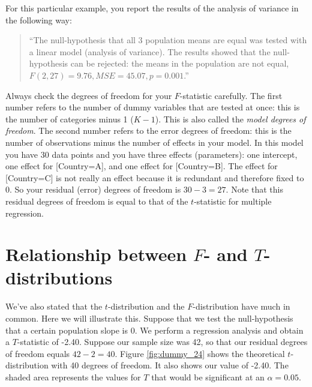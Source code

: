 \documentclass[]{book}\usepackage[]{graphicx}\usepackage[]{color}
\begin{document}
For this particular example, you report the results of the analysis of variance in the following way:

\begin{quote}
``The null-hypothesis that all 3 population means are equal was tested with a linear model (analysis of variance). The results showed that the null-hypothesis can be rejected: the means in the population are not equal, $F(2, 27) = 9.76, MSE = 45.07 , p = 0.001$.''
\end{quote}

Always check the degrees of freedom for your $F$-statistic carefully. The first number refers to the number of dummy variables that are tested at once: this is the number of categories minus 1 ($K-1$). This is also called the \textit{model degrees of freedom}. The second number refers to the error degrees of freedom: this is the number of observations minus the number of effects in your model. In this model you have 30 data points and you have three effects (parameters): one intercept, one effect for [Country=A], and one effect for [Country=B]. The effect for [Country=C] is not really an effect because it is redundant and therefore fixed to 0. So your residual (error) degrees of freedom is $30-3=27$. Note that this residual degrees of freedom is equal to that of the $t$-statistic for multiple regression.





\section{Relationship between $F$- and $T$-distributions}

We've also stated that the $t$-distribution and the $F$-distribution have much in common. Here we will illustrate this. Suppose that we test the null-hypothesis that a certain population slope is 0. We perform a regression analysis and obtain a $T$-statistic of -2.40. Suppose our sample size was 42, so that our residual degrees of freedom equals $42-2=40$. Figure \ref{fig:dummy_24} shows the theoretical $t$-distribution with 40 degrees of freedom. It also shows our value of -2.40. The shaded area represents the values for $T$ that would be significant at an $\alpha=0.05$.   
\end{document}
